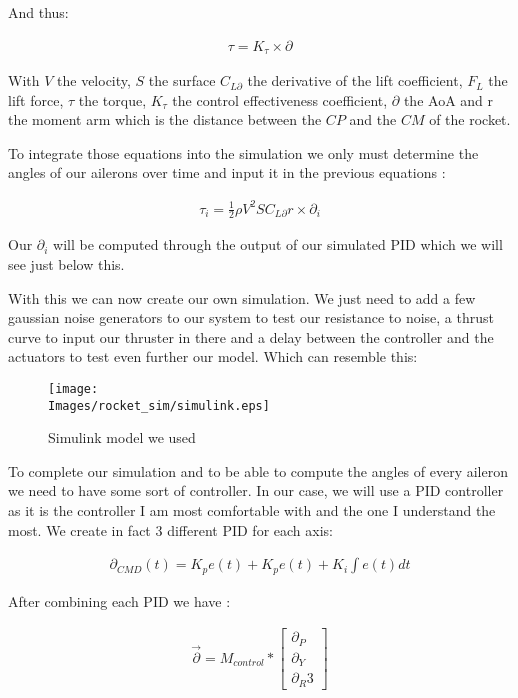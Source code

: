 And thus:

\begin{gather*}
    \tau = K_\tau \times \partial
\end{gather*}

With $V$ the velocity, $S$ the surface $C_{L \partial}$ the derivative of the
lift coefficient, $F_L$ the lift force, $\tau$ the torque, $K_\tau$ the control
effectiveness coefficient, $\partial$ the AoA and r the moment arm which is the
distance between the $CP$ and the $CM$ of the rocket.

To integrate those equations into the simulation we only must determine the
angles of our ailerons over time and input it in the previous equations :

\begin{gather*}
    \tau_i = \frac{1}{2} \rho V^2 S C_{L \partial} r \times \partial_i
\end{gather*}

Our $\partial_i$ will be computed through the output of our simulated PID which
we will see just below this.

With this we can now create our own simulation. We just need to add a few
gaussian noise generators to our system to test our resistance to noise, a
thrust curve to input our thruster in there and a delay between the controller
and the actuators to test even further our model. Which can resemble this:

\begin{figure}[!hbt]
    \centering
    \texttt{[image: \\Images/rocket\_sim/simulink.eps]}
    \caption{Simulink model we used}
\end{figure}
\FloatBarrier

To complete our simulation and to be able to compute the angles of every
aileron we need to have some sort of controller. In our case, we will use a PID
controller as it is the controller I am most comfortable with and the one I
understand the most. We create in fact 3 different PID for each axis:

\begin{gather*}
    \partial_{CMD}(t) = K_p e(t) + K_p e(t) + K_i \int e(t) dt
\end{gather*}

After combining each PID we have :

\begin{gather*}
    \overrightarrow{\partial} = M_{control} *
    \begin{bmatrix}
        \partial_P \\
        \partial_Y \\
        \partial_R 3
    \end{bmatrix}
\end{gather*}

